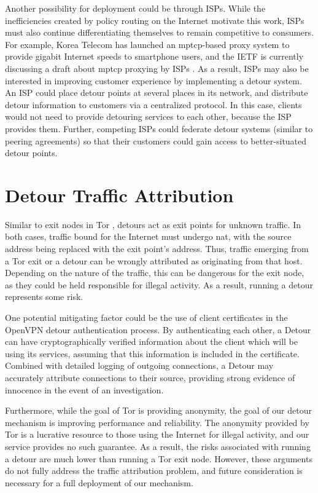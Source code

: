 \documentclass{cwru}
\begin{document}
Another possibility for deployment could be through ISPs. While the
inefficiencies created by policy routing on the Internet motivate this work,
ISPs must also continue differentiating themselves to remain competitive to
consumers. For example, Korea Telecom has launched an \ac{mptcp}-based proxy
system to provide gigabit Internet speeds to smartphone users, and the IETF is
currently discussing a draft about \ac{mptcp} proxying by ISPs
\cite{boucadair-mptcp-plain-mode-10}. As a result, ISPs may also be interested
in improving customer experience by implementing a detour system. An ISP could
place detour points at several places in its network, and distribute detour
information to customers via a centralized protocol. In this case, clients would
not need to provide detouring services to each other, because the ISP provides
them. Further, competing ISPs could federate detour systems (similar to peering
agreements) so that their customers could gain access to better-situated detour
points.

\section{Detour Traffic Attribution}

Similar to exit nodes in Tor \cite{tor}, detours act as exit points for unknown
traffic. In both cases, traffic bound for the Internet must undergo \ac{nat},
with the source address being replaced with the exit point's address. Thus,
traffic emerging from a Tor exit or a detour can be wrongly attributed as
originating from that host. Depending on the nature of the traffic, this can be
dangerous for the exit node, as they could be held responsible for illegal
activity. As a result, running a detour represents some risk.

One potential mitigating factor could be the use of client certificates in the
OpenVPN detour authentication process. By authenticating each other, a Detour
can have cryptographically verified information about the client which will be
using its services, assuming that this information is included in the
certificate. Combined with detailed logging of outgoing connections, a Detour
may accurately attribute connections to their source, providing strong evidence
of innocence in the event of an investigation.

Furthermore, while the goal of Tor is providing anonymity, the goal of our
detour mechanism is improving performance and reliability. The anonymity
provided by Tor is a lucrative resource to those using the Internet for illegal
activity, and our service provides no such guarantee. As a result, the risks
associated with running a detour are much lower than running a Tor exit node.
However, these arguments do not fully address the traffic attribution problem,
and future consideration is necessary for a full deployment of our mechanism.
\end{document}

